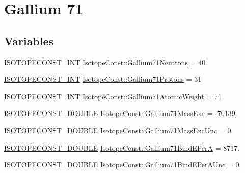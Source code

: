 \hypertarget{group___isotope_const-_gallium-_ga71}{}\section{Gallium 71}
\label{group___isotope_const-_gallium-_ga71}
\subsection*{Variables}
\begin{DoxyCompactItemize}
\item 
\mbox{\hyperlink{group___isotope_const-_macros_ga5f18360b3e99483a35c32d789e62621c}{I\+S\+O\+T\+O\+P\+E\+C\+O\+N\+S\+T\+\_\+\+I\+NT}} \mbox{\hyperlink{group___isotope_const-_gallium-_ga71_gaba0b55abe4e7374c94a1fb2a2f469cd0}{Isotope\+Const\+::\+Gallium71\+Neutrons}} = 40
\item 
\mbox{\hyperlink{group___isotope_const-_macros_ga5f18360b3e99483a35c32d789e62621c}{I\+S\+O\+T\+O\+P\+E\+C\+O\+N\+S\+T\+\_\+\+I\+NT}} \mbox{\hyperlink{group___isotope_const-_gallium-_ga71_ga04eae07a1e01044cb09e1c41a42a74f3}{Isotope\+Const\+::\+Gallium71\+Protons}} = 31
\item 
\mbox{\hyperlink{group___isotope_const-_macros_ga5f18360b3e99483a35c32d789e62621c}{I\+S\+O\+T\+O\+P\+E\+C\+O\+N\+S\+T\+\_\+\+I\+NT}} \mbox{\hyperlink{group___isotope_const-_gallium-_ga71_gae1f1b8e0dd499deb0f361b2b0ab3ac49}{Isotope\+Const\+::\+Gallium71\+Atomic\+Weight}} = 71
\item 
\mbox{\hyperlink{group___isotope_const-_macros_ga8f45a7272ce02c0b4c65c44636ed719a}{I\+S\+O\+T\+O\+P\+E\+C\+O\+N\+S\+T\+\_\+\+D\+O\+U\+B\+LE}} \mbox{\hyperlink{group___isotope_const-_gallium-_ga71_gacc29748b0d7c416b796039ae24387ce1}{Isotope\+Const\+::\+Gallium71\+Mass\+Exc}} = -\/70139.
\item 
\mbox{\hyperlink{group___isotope_const-_macros_ga8f45a7272ce02c0b4c65c44636ed719a}{I\+S\+O\+T\+O\+P\+E\+C\+O\+N\+S\+T\+\_\+\+D\+O\+U\+B\+LE}} \mbox{\hyperlink{group___isotope_const-_gallium-_ga71_ga32d02734ba7a8cd0adb1cfd2eb44fdb1}{Isotope\+Const\+::\+Gallium71\+Mass\+Exc\+Unc}} = 0.
\item 
\mbox{\hyperlink{group___isotope_const-_macros_ga8f45a7272ce02c0b4c65c44636ed719a}{I\+S\+O\+T\+O\+P\+E\+C\+O\+N\+S\+T\+\_\+\+D\+O\+U\+B\+LE}} \mbox{\hyperlink{group___isotope_const-_gallium-_ga71_ga77bf328b767cf5350077dbc35513fb6f}{Isotope\+Const\+::\+Gallium71\+Bind\+E\+PerA}} = 8717.
\item 
\mbox{\hyperlink{group___isotope_const-_macros_ga8f45a7272ce02c0b4c65c44636ed719a}{I\+S\+O\+T\+O\+P\+E\+C\+O\+N\+S\+T\+\_\+\+D\+O\+U\+B\+LE}} \mbox{\hyperlink{group___isotope_const-_gallium-_ga71_ga02c7d66f658467bffa46e72f6849b2fd}{Isotope\+Const\+::\+Gallium71\+Bind\+E\+Per\+A\+Unc}} = 0.

\end{DoxyCompactItemize}
